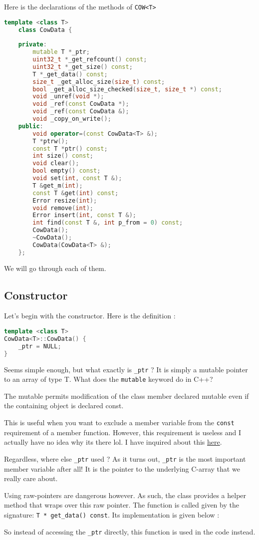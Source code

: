\documentclass[a4paper,10pt]{book}
\begin{document}
Here is the declarations of the methods of \texttt{COW<T>}

\begin{lstlisting}[language=c++]
    template <class T>
    class CowData {
    
    private:
        mutable T *_ptr;
        uint32_t *_get_refcount() const;
        uint32_t *_get_size() const;
        T *_get_data() const;
        size_t _get_alloc_size(size_t) const;
        bool _get_alloc_size_checked(size_t, size_t *) const;
        void _unref(void *);
        void _ref(const CowData *);
        void _ref(const CowData &);
        void _copy_on_write();
    public:
        void operator=(const CowData<T> &);
        T *ptrw();
        const T *ptr() const;
        int size() const;
        void clear();
        bool empty() const;
        void set(int, const T &);
        T &get_m(int);
        const T &get(int) const;
        Error resize(int);
        void remove(int);
        Error insert(int, const T &);
        int find(const T &, int p_from = 0) const;
        CowData();
        ~CowData();
        CowData(CowData<T> &);
    };
\end{lstlisting}

We will go through each of them.

\subsection{Constructor}

Let's begin with the constructor.
Here is the definition :

\begin{lstlisting}[language=c++]
template <class T>
CowData<T>::CowData() {
	_ptr = NULL;
}
\end{lstlisting}

Seems simple enough, but what exactly is \texttt{\_ptr} ?
It is simply a mutable pointer to an array of type T.
What does the \texttt{mutable} keyword do in C++?

The mutable permits modification of the class member declared mutable even if the containing object is declared const.

This is useful when you want to exclude a member variable from the \texttt{const} requirement of a member function.
However, this requirement is useless and I actually have no idea why its there lol.
I have inquired about this \href{https://github.com/godotengine/godot/issues/30706}{here}.

Regardless, where else \texttt{\_ptr} used ?
As it turns out, \texttt{\_ptr} is the most important member variable after all!
It is the pointer to the underlying C-array that we really care about.

Using raw-pointers are dangerous however.
As such, the class provides a helper method that wraps over this raw pointer.
The function is called given by the signature: \texttt{T * get\_data() const}.
Its implementation is given below :



So instead of accessing the \texttt{\_ptr} directly, this function is used in the code instead.
\end{document}
